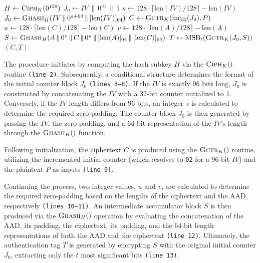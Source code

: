 \documentclass[11pt,a4paper]{report}
\begin{document}
\begin{algorithm}[htbp]
\small
\caption{GCM Authenticated Encryption}
\label{alg:gcm_ae}
\begin{algorithmic}[1]
    \State $H \gets \textsc{Ciph}_K(0^{128})$ 
        \State $J_0 \gets IV \,\|\, 0^{31} \,\|\, 1$
    \Else
        \State $s \gets 128 \cdot \lceil \text{len}(IV)/128 \rceil - \text{len}(IV)$
        \State $J_0 \gets \textsc{Ghash}_H(IV \,\|\, 0^{s+64} \,\|\, [\text{len}(IV)]_{64})$
    \EndIf
    \State $C \gets \textsc{Gctr}_K(\text{inc}_{32}(J_0), P)$ 
    \State $u \gets 128 \cdot \lceil \text{len}(C)/128 \rceil - \text{len}(C)$
    \State $v \gets 128 \cdot \lceil \text{len}(A)/128 \rceil - \text{len}(A)$
    \State $S \gets \textsc{Ghash}_H(A \,\|\, 0^v \,\|\, C \,\|\, 0^u \,\|\, [\text{len}(A)]_{64} \,\|\, [\text{len}(C)]_{64})$
    \State $T \gets \text{MSB}_t(\textsc{Gctr}_K(J_0, S))$ 
    \State \Return $(C, T)$
\EndProcedure
\end{algorithmic}
\end{algorithm}

The procedure initiates by computing the hash subkey $H$ via the $\textsc{Ciph}_K()$ routine \texttt{(line 2)}. 
Subsequently, a conditional structure determines the format of the initial counter block $J_0$ \texttt{(lines 3--8)}. 
If the $IV$ is exactly 96 bits long, $J_0$ is constructed by concatenating the $IV$ with a 32-bit counter initialized to 1. 
Conversely, if the $IV$ length differs from 96 bits, an integer $s$ is calculated to determine the required zero-padding. 
The counter block $J_0$ is then generated by passing the $IV$, the zero-padding, and a 64-bit representation of the $IV$'s length through the $\textsc{Ghash}_H()$ function.

Following initialization, the ciphertext $C$ is produced using the $\textsc{Gctr}_K()$ routine, utilizing the incremented initial counter (which resolves to \texttt{02} for a 96-bit $IV$) and the plaintext $P$ as inputs \texttt{(line 9)}.

Continuing the process, two integer values, $u$ and $v$, are calculated to determine the required zero-padding based on the lengths of the ciphertext and the AAD, respectively \texttt{(lines 10--11)}. 
An intermediate accumulator block $S$ is then produced via the $\textsc{Ghash}_H()$ operation by evaluating the concatenation of the AAD, its padding, the ciphertext, its padding, and the 64-bit length representations of both the AAD and the ciphertext \texttt{(line 12)}. 
Ultimately, the authentication tag $T$ is generated by encrypting $S$ with the original initial counter $J_0$, extracting only the $t$ most significant bits \texttt{(line 13)}.
\end{document}
